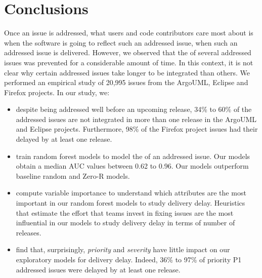 \section{Conclusions}\label{ch4:conclusion} Once an issue is
addressed, what users and code contributors care most about is when the software
is going to reflect such an addressed issue, \ie when such an addressed issue is
delivered. However, we observed that the \DIFdelbegin {}\DIFdelend \DIFaddbegin {}\DIFaddend of several addressed issues
was prevented for a considerable amount of time. In this context, it is not clear why certain
addressed issues take longer to be integrated than others. We performed
an empirical study of 20,995 issues from the ArgoUML, Eclipse and Firefox
projects. In our study, we:
\\
	\begin{itemize}
		\item despite being addressed well before an upcoming release, 34\% to
			60\% of the addressed issues are not integrated in more than one
			release in the ArgoUML and Eclipse projects. Furthermore, 98\%
			of the Firefox project issues had their \DIFdelbegin {}\DIFdelend \DIFaddbegin {}\DIFaddend delayed by
			at least one release. \\

		\item train random forest models to model the \DIFdelbegin {}\DIFdelend \DIFaddbegin {}\DIFaddend of an addressed issue. Our models obtain a
			median AUC values between 0.62 to 0.96. Our models
			outperform baseline random and Zero-R models. \\

		\item compute variable importance 
			to understand which attributes are the most important in
			our random forest models to study delivery delay.
			Heuristics that estimate the effort that teams invest in
			fixing issues are the most influential in
			our models to study delivery delay in terms of number of
			releases. \\

		\item find that, surprisingly, \textit{priority} and
			\textit{severity} have little impact on our exploratory
			models for delivery delay.
			Indeed, 36\% to 97\% of priority P1 addressed issues
			were delayed by at least one release. \\ 


\end{itemize}
